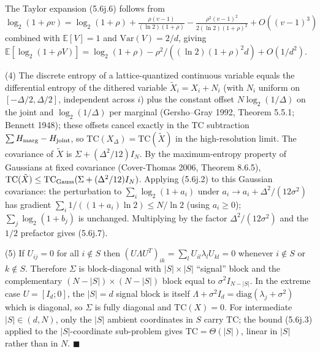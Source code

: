 \documentclass[
]{article}
\begin{document}
The Taylor expansion (5.6j.6) follows from $\log_2(1 + \rho v)
= \log_2(1 + \rho) + \tfrac{\rho(v-1)}{(\ln 2)(1+\rho)}
- \tfrac{\rho^2 (v-1)^2}{2 (\ln 2)(1+\rho)^2} + O((v-1)^3)$ combined
with $\mathbb{E}[V] = 1$ and $\mathrm{Var}(V) = 2/d$, giving
$\mathbb{E}[\log_2(1+\rho V)] = \log_2(1+\rho) - \rho^2/((\ln 2)
(1+\rho)^2 d) + O(1/d^2)$.

\noindent (4) The discrete entropy of a lattice-quantized continuous
variable equals the differential entropy of the dithered variable
$\tilde X_i = X_i + N_i$ (with $N_i$ uniform on $[-\Delta/2,
\Delta/2]$, independent across $i$) plus the constant offset $N
\log_2(1/\Delta)$ on the joint and $\log_2(1/\Delta)$ per marginal
(Gersho--Gray 1992, Theorem 5.5.1; Bennett 1948); these offsets cancel
exactly in the TC subtraction $\sum H_{\rm marg} - H_{\rm joint}$, so
$\mathrm{TC}(X_\Delta) = \mathrm{TC}(\tilde X)$ in the high-resolution
limit. The covariance of $\tilde X$ is $\Sigma + (\Delta^2/12) I_N$.
By the maximum-entropy property of Gaussians at fixed covariance
(Cover-Thomas 2006, Theorem 8.6.5),
$\mathrm{TC}(\tilde X) \leq \mathrm{TC}_{\rm Gauss}(\Sigma +
(\Delta^2/12) I_N)$. Applying (5.6j.2) to this Gaussian covariance:
the perturbation to $\sum_i \log_2(1 + a_i)$ under $a_i \to a_i +
\Delta^2/(12\sigma^2)$ has gradient $\sum_i 1/((1+a_i) \ln 2) \leq
N/\ln 2$ (using $a_i \geq 0$); $\sum_j \log_2(1+b_j)$ is unchanged.
Multiplying by the factor $\Delta^2/(12\sigma^2)$ and the $1/2$
prefactor gives (5.6j.7).

\noindent (5) If $U_{ij} = 0$ for all $i \notin S$ then
$(U\Lambda U^T)_{ik} = \sum_l U_{il} \lambda_l U_{kl} = 0$ whenever
$i \notin S$ or $k \notin S$. Therefore $\Sigma$ is block-diagonal
with $|S| \times |S|$ ``signal'' block and the complementary
$(N-|S|) \times (N-|S|)$ block equal to $\sigma^2 I_{N-|S|}$. In the
extreme case $U = [I_d; 0]$, the $|S|=d$ signal block is itself
$\Lambda + \sigma^2 I_d = \mathrm{diag}(\lambda_j + \sigma^2)$ which
is diagonal, so $\Sigma$ is fully diagonal and $\mathrm{TC}(X) = 0$.
For intermediate $|S| \in (d, N)$, only the $|S|$ ambient
coordinates in $S$ carry TC; the bound (5.6j.3) applied to the
$|S|$-coordinate sub-problem gives $\mathrm{TC} = \Theta(|S|)$,
linear in $|S|$ rather than in $N$.
\hfill$\blacksquare$
\end{document}
